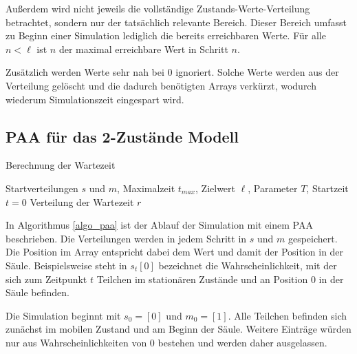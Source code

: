 Außerdem wird nicht jeweils die vollständige Zustands-Werte-Verteilung betrachtet, sondern nur der tatsächlich relevante Bereich. Dieser Bereich umfasst zu Beginn einer Simulation lediglich die bereits erreichbaren Werte. Für alle $n<\ell$ ist $n$ der maximal erreichbare Wert in Schritt $n$.

Zusätzlich werden Werte sehr nah bei $0$ ignoriert. Solche Werte werden aus der Verteilung gelöscht und die dadurch benötigten Arrays verkürzt, wodurch wiederum Simulationszeit eingespart wird.



\subsection{PAA für das 2-Zustände Modell}

\begin{algorithm}
\caption{Berechnung der Wartezeit}
\label{algo_paa}
\begin{algorithmic}
\REQUIRE Startverteilungen $s$ und $m$, Maximalzeit $t_{max}$, Zielwert $\ell$, Parameter $T$, Startzeit $t=0$
\ENSURE Verteilung der Wartezeit
\ELSE
{}
\ENDIF
{}
\ENDWHILE
\RETURN $r$
\end{algorithmic}
\end{algorithm}

In Algorithmus \ref{algo_paa} ist der Ablauf der Simulation mit einem PAA beschrieben. Die Verteilungen werden in jedem Schritt in $s$ und $m$ gespeichert. Die Position im Array entspricht dabei dem Wert und damit der Position in der Säule. 
Beispielsweise steht in $s_t[0]$ bezeichnet die Wahrscheinlichkeit, mit der sich zum Zeitpunkt $t$ Teilchen im stationären Zustände und an Position $0$ in der Säule befinden.

Die Simulation beginnt mit $s_0 = [0]$ und $m_0 = [1]$. Alle Teilchen befinden sich zunächst im mobilen Zustand und am Beginn der Säule. Weitere Einträge würden nur aus Wahrscheinlichkeiten von $0$ bestehen und werden daher ausgelassen.

